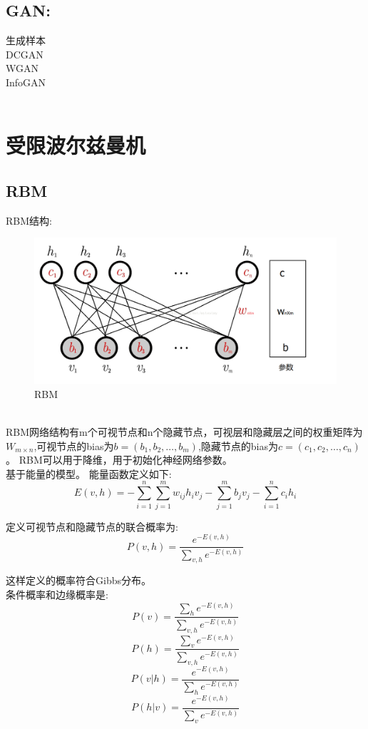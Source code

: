 \documentclass{article}
\begin{document}
\subsection{GAN:}
生成样本\\
DCGAN\\
WGAN\\
InfoGAN\\
\\

\section{受限波尔兹曼机}
\subsection{RBM}
RBM结构:
\begin{figure}[h]
\centering
\includegraphics[width=0.8\linewidth]{1.png}
\caption{RBM}
\end{figure}\\

RBM网络结构有m个可视节点和n个隐藏节点，可视层和隐藏层之间的权重矩阵为$W_{m \times n}$,可视节点的bias为$b=(b_1,b_2,\dots,b_m)$,隐藏节点的bias为$c=(c_1,c_2,\dots,c_n)$。
RBM可以用于降维，用于初始化神经网络参数。\\
基于能量的模型。
能量函数定义如下:
\begin{equation}
E(v,h)=-\sum_{i=1}^{n}\sum_{j=1}^{m}w_{ij}h_iv_j-\sum_{j=1}^{m}b_jv_j-\sum_{i=1}^{n}c_ih_i \tag{2.1.1}
\end{equation}

定义可视节点和隐藏节点的联合概率为:
\begin{equation}
P(v,h)= \frac{e^{-E(v,h)}}{\sum_{v,h}e^{-E(v,h)}} \tag{2.1.2}
\end{equation}

这样定义的概率符合Gibbs分布。\\

条件概率和边缘概率是:
\begin{equation}
P(v)= \frac{\sum_he^{-E(v,h)}}{\sum_{v,h}e^{-E(v,h)}} \tag{2.1.3}
\end{equation}
\begin{equation}
P(h)= \frac{\sum_ve^{-E(v,h)}}{\sum_{v,h}e^{-E(v,h)}} \tag{2.1.4}
\end{equation}
\begin{equation}
P(v|h)=\frac{e^{-E(v,h)}}{\sum_he^{-E(v,h)}} \tag{2.1.5}
\end{equation}
\begin{equation}
P(h|v)=\frac{e^{-E(v,h)}}{\sum_ve^{-E(v,h)}} \tag{2.1.6}
\end{equation}
\end{document}

